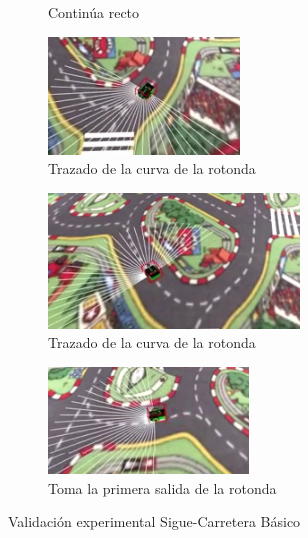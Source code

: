 \documentclass{report}
\begin{document}
\begin{figure}[h]
\begin{subfigure}{.5\textwidth}
  \caption{Continúa recto}
  \label{fig:sub-fourth}
\end{subfigure}
\begin{subfigure}{.5\textwidth}
  \centering
  \includegraphics[width=.7\linewidth]{images/cap4/5.png}  
  \caption{Trazado de la curva de la rotonda}
  \label{fig:sub-first}
\end{subfigure}
\begin{subfigure}{.5\textwidth}
  \centering
  \includegraphics[width=.7\linewidth]{images/cap4/6.png}  
  \caption{Trazado de la curva de la rotonda}
  \label{fig:sub-second}
\end{subfigure}
\begin{subfigure}{.5\textwidth}
  \centering
  \includegraphics[width=.7\linewidth]{images/cap4/7.png}  
  \caption{Toma la primera salida de la rotonda}
  \label{fig:sub-third}
\end{subfigure}
\caption{Validación experimental Sigue-Carretera Básico}
\label{fig:fig}
\end{figure}
\end{document}
